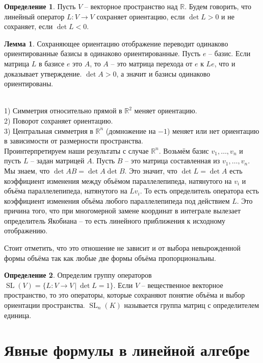 \documentclass[10pt,a4paper,oneside]{book}
\theoremstyle{definition}
\newtheorem*{defn}{\color{yellow!30!red} Определение}
\newtheorem{lem}{\color{green!50!black}Лемма}
\newcommand{\mb}[1]{\mathbb{#1}}
\newcommand{\SL}{\operatorname{SL}}
\def\exm{\noindent {\bf Примеры:}}
\def\dfn{\begin{defn}}
\def\edfn{\end{defn}}
\def\lm{\begin{lem}}
\def\elm{\end{lem}}
\begin{document}
\dfn Пусть $V$ -- векторное пространство над $\mb R$. Будем говорить, что линейный оператор $L\colon V \to V$ сохраняет ориентацию, если $\det L>0$ и не сохраняет, если $\det L<0$.
\edfn

\lm Сохраняющее ориентацию отображение переводит одинаково ориентированные базисы в одинаково ориентированные.
\proof Пусть $e$ -- базис. Если матрица $L$  в базисе $e$ это $A$, то $A$ -- это матрица перехода от $e$ к $Le$, что и доказывает утверждение. $\det A > 0$, а значит и базисы одинаково ориентированы.
\endproof
\elm

\exm\\
1) Симметрия относительно прямой в $\mb R^2$ меняет ориентацию.\\
2) Поворот сохраняет ориентацию.\\
3) Центральная симметрия в $\mb R^n$ (домножение на $-1$) меняет или нет ориентацию в зависимости  от размерности пространства.\\





Проинтерпретируем наши результаты с случае $\mb R^n$. Возьмём базис $v_1,\dots,v_n$ и пусть $L$ -- задан матрицей $A$. Пусть $B$ -- это матрица составленная из $v_1,\dots,v_n$. Мы знаем, что $\det AB= \det A \det B$. Это значит, что $\det L= \det A$ есть коэффициент изменения между объёмом параллелепипеда, натянутого на $v_i$ и объёма параллелепипеда, натянутого на $Lv_i$. То есть определитель оператора есть коэффициент изменения объёма любого параллелепипеда под действием $L$. Это причина того, что при многомерной замене координат в интеграле вылезает определитель Якобиана -- то есть линейного приближения к исходному отображению.

Стоит отметить, что это отношение не зависит и от выбора невырожденной формы объёма так как любые две формы объёма пропорциональны.


\dfn Определим группу операторов $\SL(V)=\{ L\colon V \to V \,|\, \det L=1\}$. Если $V$ -- вещественное векторное пространство, то это операторы, которые сохраняют понятие объёма и  выбор ориентации пространства. $\SL_n(K)$ называется группа матриц с определителем единица.
\edfn







\section{Явные формулы в линейной алгебре}
\end{document}
